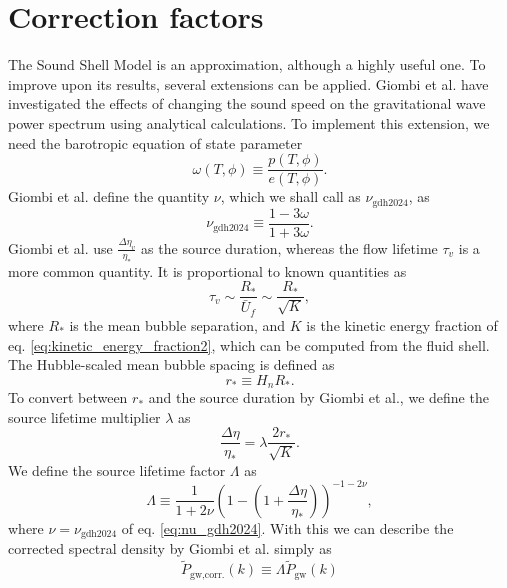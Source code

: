 \section{Correction factors}
\label{correction_factors}
The Sound Shell Model is an approximation, although a highly useful one.
To improve upon its results, several extensions can be applied.
Giombi et al. have investigated the effects of changing the sound speed on the gravitational wave power spectrum using analytical calculations.
To implement this extension, we need the barotropic equation of state parameter
\cite[p. 3]{giombi_cs_2024}
\begin{equation}
\omega(T,\phi) \equiv \frac{p(T,\phi)}{e(T,\phi)}.
\end{equation}
Giombi et al. define the quantity $\nu$, which we shall call as $\nu_\text{gdh2024}$, as
\cite[eq. 2.11]{giombi_cs_2024}
\begin{equation}
\nu_\text{gdh2024} \equiv \frac{1 - 3\omega}{1 + 3\omega}.
\label{eq:nu_gdh2024}
\end{equation}
Giombi et al. use $\frac{\Delta \eta_v}{\eta_*}$ as the source duration,
whereas the flow lifetime $\tau_v$ is a more common quantity.
It is proportional to known quantities as
\cites[p. 3]{hindmarsh_gw_pt_2019}[p. 6]{gowling_lisa_2021}
\begin{equation}
\tau_v \sim \frac{R_*}{\bar{U}_f} \sim \frac{R_*}{\sqrt{K}},
\end{equation}
where $R_*$ is the mean bubble separation, and
$K$ is the kinetic energy fraction of eq. \eqref{eq:kinetic_energy_fraction2},
which can be computed from the fluid shell.
The Hubble-scaled mean bubble spacing is defined as
\cite[eq. 2.2]{gowling_lisa_2021}
\begin{equation}
r_* \equiv H_n R_*.
\end{equation}
To convert between $r_*$ and the source duration by Giombi et al.,
we define the source lifetime multiplier $\lambda$ as
\begin{equation}
\frac{\Delta \eta}{\eta_*} = \lambda \frac{2 r_*}{\sqrt{K}}.
\end{equation}
We define the source lifetime factor $\Lambda$ as
\cite[eq. 3.13]{giombi_cs_2024}
\begin{equation}
\Lambda \equiv \frac{1}{1 + 2\nu} \left(1 - \left(1 + \frac{\Delta \eta}{\eta_*} \right) \right)^{-1-2\nu},
\end{equation}
where $\nu = \nu_\text{gdh2024}$ of eq. \eqref{eq:nu_gdh2024}.
With this we can describe the corrected spectral density by Giombi et al. simply as
\begin{equation}
\tilde{P}_\text{gw,corr.}(k)
\equiv \Lambda \tilde{P}_\text{gw}(k)
\end{equation}

